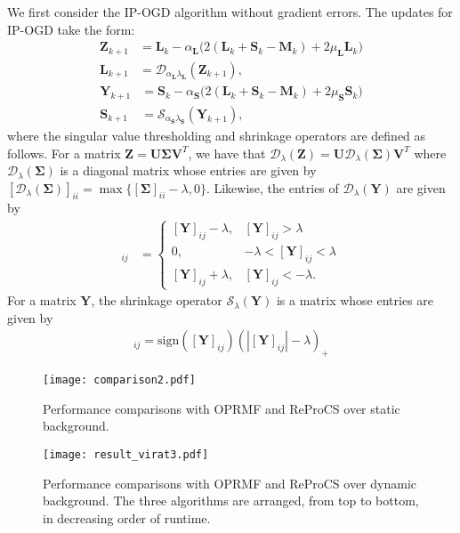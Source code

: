 \documentclass[draftcls,onecolumn,12pt]{IEEEtran}
\theoremstyle{plain}
\def\D{\mathcal{D}}
\def\U{\mathbf{U}}
\def\V{\mathbf{V}}
\def\Sig{\boldsymbol{\Sigma}}
\def\Z{\mathbf{Z}}
\def\Y{\mathbf{Y}}
\providecommand{\abs}[1]{\left|#1\right|}
\theoremstyle{plain}
\theoremstyle{remark}
\begin{document}
We first consider the IP-OGD algorithm without gradient errors. The updates for IP-OGD take the form:
\begin{align}
\mathbf{Z}_{k+1}&= \mathbf{L}_k- \alpha_{\mathbf{L}}\bigg( 2 (\mathbf{L}_k+\mathbf{S}_k-\mathbf{M}_k) +2 \mu_{\mathbf{L}} \mathbf{L}_k\bigg)\nonumber \\
\mathbf{L}_{k+1}&=\D_{\alpha_{\mathbf{L}}\lambda_{\mathbf{L}}}(\mathbf{Z}_{k+1}), 
\end{align}
\begin{align}
\mathbf{Y}_{k+1}&= \mathbf{S}_k- \alpha_{\mathbf{S}}\bigg( 2 (\mathbf{L}_{k}+\mathbf{S}_k-\mathbf{M}_k) +2 \mu_{\mathbf{S}} \mathbf{S}_k\bigg) \nonumber \\
\mathbf{S}_{k+1}&= \mathcal{S}_{\alpha_{\mathbf{S}} \lambda_{\mathbf{S}}}(\mathbf{Y}_{k+1}) ,
\end{align}
where the singular value thresholding and shrinkage operators are defined as follows. For a matrix $\Z = \U\Sig\V^T$, we have that $\D_\lambda(\Z) = \U\D_\lambda(\Sig)\V^T$ where $\D_\lambda(\Sig)$ is a diagonal matrix whose entries are given by $[\D_\lambda(\Sig)]_{ii} = \max\{[\Sig]_{ii}-\lambda,0\}$. Likewise, the entries of $\D_\lambda(\Y)$ are given by 
\begin{align}
[\D_\lambda(\Y)]_{ij} &= \begin{cases} [\Y]_{ij}-\lambda, & [\Y]_{ij} > \lambda \\
0, & -\lambda < [\Y]_{ij} < \lambda \\
 [\Y]_{ij} + \lambda, & [\Y]_{ij} < -\lambda .
\end{cases}
\end{align}
For a matrix $\Y$, the shrinkage operator $\mathcal{S}_{\lambda}(\Y)$ is a matrix whose entries are given by
\begin{align}
[\mathcal{S}_{\lambda}(\Y)]_{ij} = \text{sign}([\Y]_{ij})(\abs{[\Y]_{ij}}-\lambda)_{+}
\end{align}

\begin{figure}
\centering
	\texttt{[image: comparison2.pdf]}
	\caption{Performance comparisons with OPRMF \cite{wang2012probabilistic} and ReProCS \cite{reprocs} over static background.}\label{static}
\end{figure}
\begin{figure}
\centering
\hspace*{-0.5cm}	\texttt{[image: result\_virat3.pdf]}
	\caption{Performance comparisons with OPRMF \cite{wang2012probabilistic} and ReProCS \cite{reprocs} over dynamic background. The three algorithms are arranged, from top to bottom, in decreasing order of runtime. 
	}
	\label{dynamic}
\end{figure}
\end{document}
